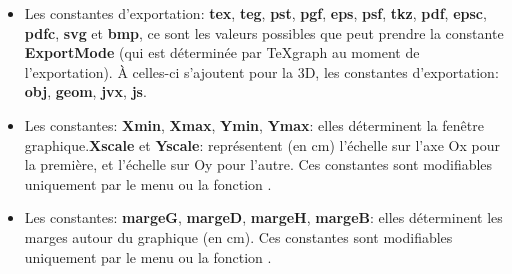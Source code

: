 \begin{itemize}
\begin{itemize}
    \item \textbf[TmpPath]{TmpPath}: chemin d'accès à un répertoire temporaire. C'est le dossier \verb|$HOME/.TeXgraph| sous linux, et \verb|c:\tmp| sous windows.

    \item \textbf[JavaviewPath]{JavaviewPath}: chemin d'accès au fichier \textit{javaview.jar} si vous l'avez installé. Sa valeur est à définir dans le fichier de configuration: menu \textit{Paramètres/Fichier de configuration}.

    \item \textbf[LF]{LF}: provoque un passage à la ligne lors de l'affichage de la chaîne.

    \item \textbf[Diese]{Diese}: qui renvoie le caractère du même nom (utilisé comme délimiteur dans les sources TeXgraph). 
    \item \textbf[DirSep]{DirSep}: qui renvoie le caractère séparateur utilisé par le système dans les chemins d'accès aux fichiers.

    \item \textbf[ND]{ND}: qui signifie \og non défini\fg. Elle contient la chaîne de caractères \verb|"_ND"|. Elle est utilisée lors de la lecture des fichiers \emph{csv} pour désigner les éléments vides.
    \end{itemize}

\item Les constantes d'exportation: \textbf{tex}, \textbf{teg}, \textbf{pst}, \textbf{pgf}, \textbf{eps}, \textbf{psf}, \textbf{tkz}, \textbf{pdf}, \textbf{epsc}, \textbf{pdfc}, \textbf{svg} et \textbf{bmp}, ce sont les valeurs possibles que peut prendre la constante \textbf{ExportMode} (qui est déterminée par TeXgraph au moment de l'exportation). À celles-ci s'ajoutent pour la 3D, les constantes d'exportation: \textbf{obj}, \textbf{geom}, \textbf{jvx}, \textbf{js}.

\item Les constantes: \textbf{Xmin}, \textbf{Xmax}, \textbf{Ymin}, \textbf{Ymax}: elles déterminent la fenêtre graphique.\textbf{Xscale} et \textbf{Yscale}: représentent (en cm) l'échelle sur l'axe Ox pour la première, et l'échelle sur Oy pour l'autre. Ces constantes sont modifiables uniquement par le menu ou la fonction .

\item Les constantes: \textbf{margeG}, \textbf{margeD}, \textbf{margeH}, \textbf{margeB}: elles déterminent les marges autour du graphique (en cm). Ces constantes sont modifiables uniquement par le menu ou la fonction
.


\end{itemize}
